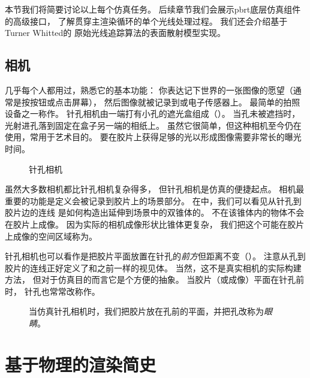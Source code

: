 本节我们将简要讨论以上每个仿真任务。
后续章节我们会展示pbrt底层仿真组件的高级接口，
了解贯穿主渲染循环的单个光线处理过程。
我们还会介绍基于Turner Whitted的
原始光线追踪算法的表面散射模型实现。

\subsection{相机}\label{sub:相机}

几乎每个人都用过，熟悉它的基本功能：
你表达记下世界的一张图像的愿望（通常是按按钮或点击屏幕），
然后图像就被记录到或电子传感器上。
最简单的拍照设备之一称作。
针孔相机由一端打有小孔的遮光盒组成（）。
当孔未被遮挡时，光射进孔落到固定在盒子另一端的相纸上。
虽然它很简单，但这种相机至今仍在使用，常用于艺术目的。
要在胶片上获得足够的光以形成图像需要非常长的曝光时间。
\begin{figure}[h]
    \centering
    \caption{针孔相机}\label{fig:1.1}
\end{figure}

虽然大多数相机都比针孔相机复杂得多，
但针孔相机是仿真的便捷起点。
相机最重要的功能是定义会被记录到胶片上的场景部分。
在中，我们可以看见从针孔到胶片边的连线
是如何构造出延伸到场景中的双锥体的。
不在该锥体内的物体不会在胶片上成像。
因为实际的相机成像形状比锥体更复杂，
我们把这个可能在胶片上成像的空间区域称为。

针孔相机也可以看作是把胶片平面放置在针孔的\emph{前方}但距离不变（）。
注意从孔到胶片的连线正好定义了和之前一样的视见体。
当然，这不是真实相机的实际构建方法，
但对于仿真目的而言它是个方便的抽象。
当胶片（或成像）平面在针孔前时，
针孔也常常改称作。
\begin{figure}[h]
    \centering
    \caption{当仿真针孔相机时，我们把胶片放在孔前的平面，并把孔改称为\emph{眼睛}。}\label{fig:1.2}
\end{figure}
\section{基于物理的渲染简史}\label{sec:基于物理的渲染简史}

